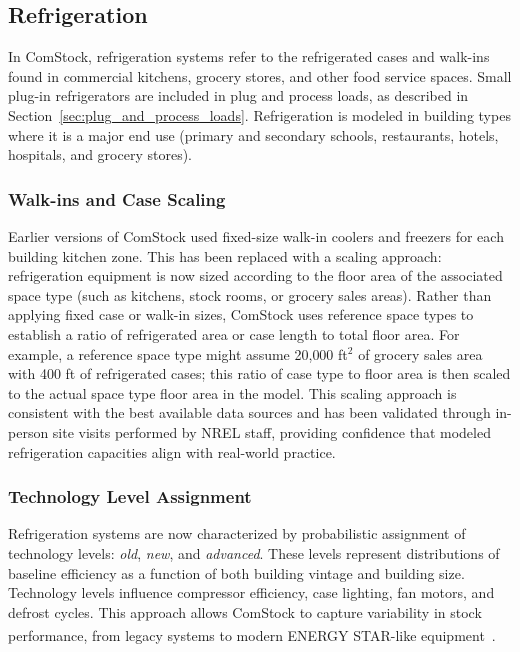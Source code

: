 \subsection{Refrigeration}
\label{sec:refrigeration}

In ComStock, refrigeration systems refer to the refrigerated cases and walk-ins found in commercial kitchens, grocery stores, and other food service spaces. Small plug-in refrigerators are included in plug and process loads, as described in Section~\ref{sec:plug_and_process_loads}. Refrigeration is modeled in building types where it is a major end use (primary and secondary schools, restaurants, hotels, hospitals, and grocery stores).

\subsubsection{Walk-ins and Case Scaling}
Earlier versions of ComStock used fixed-size walk-in coolers and freezers for each building kitchen zone. This has been replaced with a scaling approach: refrigeration equipment is now sized according to the floor area of the associated space type (such as kitchens, stock rooms, or grocery sales areas). Rather than applying fixed case or walk-in sizes, ComStock uses reference space types to establish a ratio of refrigerated area or case length to total floor area. For example, a reference space type might assume 20{,}000 ft$^2$ of grocery sales area with 400 ft of refrigerated cases; this ratio of case type to floor area is then scaled to the actual space type floor area in the model. This scaling approach is consistent with the best available data sources and has been validated through in-person site visits performed by NREL staff, providing confidence that modeled refrigeration capacities align with real-world practice.

\subsubsection{Technology Level Assignment}
Refrigeration systems are now characterized by probabilistic assignment of technology levels: \textit{old}, \textit{new}, and \textit{advanced}. These levels represent distributions of baseline efficiency as a function of both building vintage and building size. Technology levels influence compressor efficiency, case lighting, fan motors, and defrost cycles. This approach allows ComStock to capture variability in stock performance, from legacy systems to modern ENERGY STAR\textsuperscript{\textregistered}-like equipment~\citep{DOE_TSD_2009,ENERGYSTAR_Refrigeration}.

